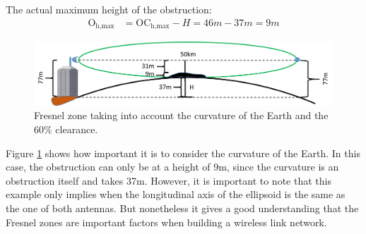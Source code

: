 The actual maximum height of the obstruction:
\begin{align}
\text{O}_{\text{h,max}} &= \text{OC}_{\text{h,max}} - H = 46m - 37m = 9m
\label{height_max_with_curv}
\end{align}

\begin{figure}[H]
	\centering
	\includegraphics[scale=0.50]{figures/fresnel_50km_curvature_obstacle.png}
	\caption{Fresnel zone taking into account the curvature of the Earth and the 60$\%$ clearance.}
	\label{fig:fresnel_50km_curvature_obstacle}
\end{figure}  

Figure \ref{fig:fresnel_50km_curvature_obstacle} shows how important it is to consider the curvature of the Earth. In this case, the obstruction can only be at a height of 9m, since the curvature is an obstruction itself and takes 37m. However, it is important to note that this example only implies when the longitudinal axis of the ellipsoid is the same as the one of both antennas. But nonetheless it gives a good understanding that the Fresnel zones are important factors when building a wireless link network.
